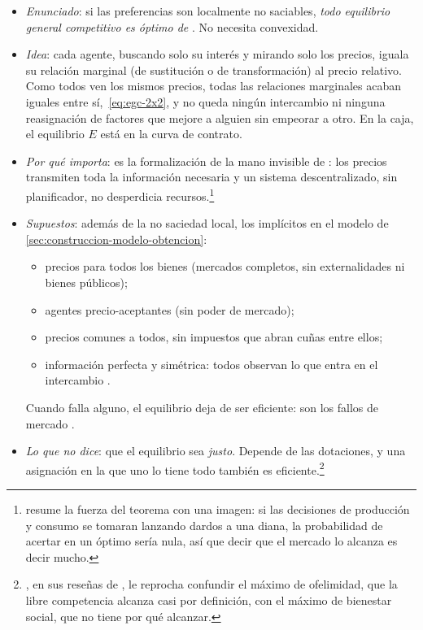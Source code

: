 \documentclass[11pt]{article}
\begin{document}
\begin{itemize}
\item \emph{Enunciado}: si las preferencias son localmente no saciables, \emph{todo equilibrio general competitivo es óptimo de }. No necesita convexidad.
\item \emph{Idea}: cada agente, buscando solo su interés y mirando solo los precios, iguala su relación marginal (de sustitución o de transformación) al precio relativo. Como todos ven los mismos precios, todas las relaciones marginales acaban iguales entre sí,~\eqref{eq:egc-2x2}, y no queda ningún intercambio ni ninguna reasignación de factores que mejore a alguien sin empeorar a otro. En la caja, el equilibrio $E$ está en la curva de contrato.
\item \emph{Por qué importa}: es la formalización de la mano invisible de : los precios transmiten toda la información necesaria y un sistema descentralizado, sin planificador, no desperdicia recursos.\footnote{\textcite{Feldman1987Welfare} resume la fuerza del teorema con una imagen: si las decisiones de producción y consumo se tomaran lanzando dardos a una diana, la probabilidad de acertar en un óptimo sería nula, así que decir que el mercado lo alcanza es decir mucho.}
\item \emph{Supuestos}: además de la no saciedad local, los implícitos en el modelo de \ref{sec:construccion-modelo-obtencion}:
  \begin{itemize}
  \item precios para todos los bienes (mercados completos, sin externalidades ni bienes públicos);
  \item agentes precio-aceptantes (sin poder de mercado);
  \item precios comunes a todos, sin impuestos que abran cuñas entre ellos;
  \item información perfecta y simétrica: todos observan lo que entra en el intercambio .
  \end{itemize}
  Cuando falla alguno, el equilibrio deja de ser eficiente: son los fallos de mercado .
\item \emph{Lo que no dice}: que el equilibrio sea \emph{justo}. Depende de las dotaciones, y una asignación en la que uno lo tiene todo también es eficiente.\footnote{, en sus reseñas de \nocite{Wicksell1958Selected}, le reprocha confundir el máximo de ofelimidad, que la libre competencia alcanza casi por definición, con el máximo de bienestar social, que no tiene por qué alcanzar.}
\end{itemize}
\end{document}

